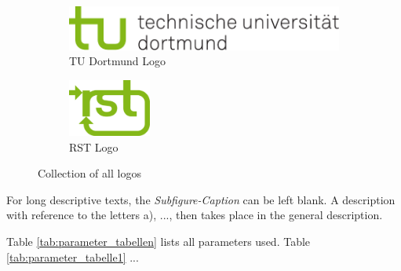 \begin{figure}[htbp]
        \centering
        \begin{subfigure}[b]{0.3\textwidth}
        		\centering
                \includegraphics[width=\textwidth]{images/logos/tud_logo_rgb} 
                \caption{TU Dortmund Logo}
                \label{fig:subfigure_tud_logo}
        \end{subfigure}%
        \quad %
        \begin{subfigure}[b]{0.3\textwidth}
        		\centering
                \includegraphics[width=0.3\textwidth]{images/logos/rst_logo_rgb} %
                \caption{RST Logo}
                \label{fig:subfigure_rst_rgb}
        \end{subfigure}
        \caption{Collection of all logos}
        \label{fig:logos}
\end{figure}

For long descriptive texts, the \textit{Subfigure-Caption} can be left blank. A description with reference to the letters a), ..., then takes place in the general description.

Table \ref{tab:parameter_tabellen} lists all parameters used. Table \ref{tab:parameter_tabelle1} ...

